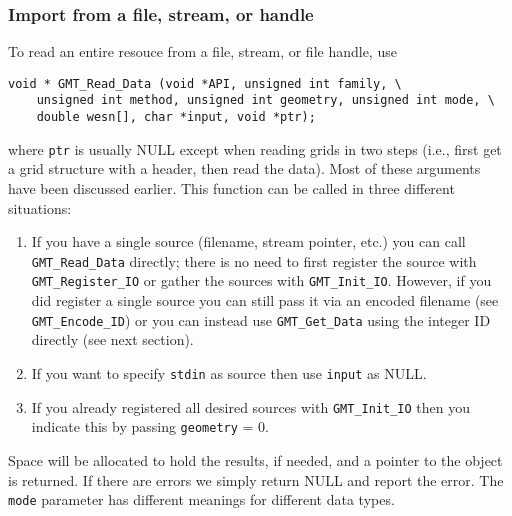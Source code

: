 \documentclass[11pt]{report}
\begin{document}
\subsubsection{Import from a file, stream, or handle}
To read an entire resouce from a file, stream, or file handle, use
\begin{verbatim}
void * GMT_Read_Data (void *API, unsigned int family, \
    unsigned int method, unsigned int geometry, unsigned int mode, \
    double wesn[], char *input, void *ptr);
\end{verbatim}
where \texttt{ptr} is usually NULL except when reading grids in two steps
(i.e., first get a grid structure with a header, then read the data).
Most of these arguments have been discussed earlier.  This function can
be called in three different situations:
\begin{enumerate}
\item If you have a single source (filename, stream pointer, etc.) you can call
\texttt{GMT\_Read\_Data} directly; there is no need to first register the source
with \texttt{GMT\_Register\_IO} or gather the sources with \texttt{GMT\_Init\_IO}.
However, if you did register a single source you can still pass it via an encoded
filename (see \texttt{GMT\_Encode\_ID}) or you can instead use \texttt{GMT\_Get\_Data}
using the integer ID directly (see next section).
\item If you want to specify \texttt{stdin} as source then use \texttt{input} as NULL.
\item If you already registered all desired sources with \texttt{GMT\_Init\_IO} then
you indicate this by passing \texttt{geometry} = 0.
\end{enumerate}
Space will be allocated to hold the results, if needed, and a pointer to the object is returned.
If there are errors we simply return NULL and report the error.
The \texttt{mode} parameter has different meanings for different data types.
\end{document}
